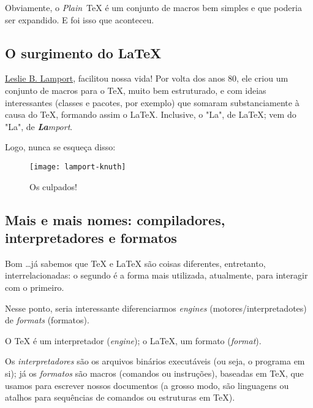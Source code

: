 Obviamente, o \textit{Plain}~\TeX{} é um conjunto de macros bem simples e que 
poderia ser expandido.
E foi isso que aconteceu.

\subsection{O surgimento do \LaTeX} %

\href{https://pt.wikipedia.org/wiki/Leslie_Lamport}{Leslie B. Lamport}, facilitou 
nossa vida! 
Por volta dos anos 80, ele criou um conjunto de macros para o \TeX, muito bem 
estruturado, e com ideias interessantes (classes e pacotes, por exemplo) que 
somaram substanciamente à causa do \TeX{}, formando assim o \LaTeX.
Inclusive, o "La", de \LaTeX{}; vem do "La", de \textit{\textbf{La}mport}.

Logo, nunca se esqueça disso:


\begin{figure}[!ht]
  \centering
  \texttt{[image: lamport-knuth]}
  \caption{Os culpados!}
\end{figure}

\subsection{Mais e mais nomes: compiladores, interpretadores e formatos} %

Bom \ldots já sabemos que  \TeX{} e \LaTeX{} são coisas diferentes, entretanto,
interrelacionadas: o segundo é a forma mais utilizada, atualmente, para 
interagir com o primeiro.

Nesse ponto, seria interessante diferenciarmos \textit{engines} (motores/interpretadotes) 
de \textit{formats} (formatos).

O \TeX{} é um interpretador (\textit{engine}); o \LaTeX, um formato (\textit{format}).


Os \textit{interpretadores} são os arquivos binários executáveis (ou seja, o 
programa em si); já os \textit{formatos} são macros (comandos ou instruções), 
baseadas em \TeX, que usamos para escrever nossos documentos (a grosso modo, são
linguagens ou atalhos para sequências de comandos ou estruturas em \TeX).

